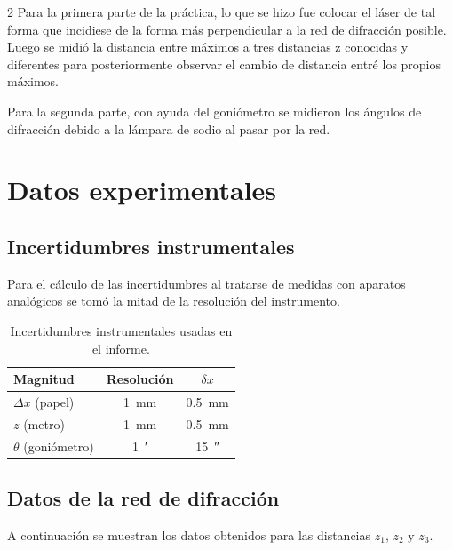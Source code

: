 \documentclass[12pt,a4paper]{article}
\begin{document}
\begin{multicols}{2}
Para la primera parte de la práctica, lo que se hizo fue colocar el láser de tal forma que incidiese de la forma más perpendicular a la red de difracción posible. Luego se midió la distancia entre máximos a tres distancias z conocidas y diferentes para posteriormente observar el cambio de distancia entré los propios máximos.

Para la segunda parte, con ayuda del goniómetro se midieron los ángulos de difracción debido a la lámpara de sodio al pasar por la red.

\section{Datos experimentales}

\subsection{Incertidumbres instrumentales}

Para el cálculo de las incertidumbres al tratarse de medidas con aparatos analógicos se tomó la mitad de la resolución del instrumento.

\begin{table}[H]
\centering
\caption{Incertidumbres instrumentales usadas en el informe.}
\label{tab:incertidumbres}
\vspace{0.3cm}
\begin{tabular}{lcc}
\toprule
Magnitud & Resolución & $\delta x$ \\
\midrule
$\Delta x$ (papel) & \SI{1}{mm}          & \SI{0,5}{mm} \\
$z$ (metro)        & \SI{1}{mm}          & \SI{0,5}{mm} \\
$\theta$ (goniómetro) & \SI{1}{\arcminute} & \SI{15}{\arcsecond} \\
\bottomrule
\end{tabular}
\end{table}

\subsection{Datos de la red de difracción}

A continuación se muestran los datos obtenidos para las distancias $z_1$, $z_2$ y $z_3$.

\begin{table}[H]
\centering
\caption{Medidas para $z_1=(2{,}0000\pm0{,}0005)$ m.}
\label{tab:z1}
\vspace{0.3cm}
\end{table}


\end{multicols}
\end{document}
